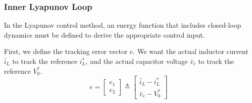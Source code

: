 \documentclass[DIV=calc, paper=a4, fontsize=11pt, twocolumn]{scrartcl}	 %
\begin{document}
\subsubsection{Inner Lyapunov Loop}
In the Lyapunov control method, an energy function that includes closed-loop dynamics must be defined to derive the appropriate control input.

First, we define the tracking error vector $e$. We want the actual inductor current $\bar{i}_L$ to track the reference $i_L^*$, and the actual capacitor voltage $\bar{v}_c$ to track the reference $V_0^*$. 
\begin{equation}\label{eq:error_state}
    e = \begin{bmatrix} e_1 \\ e_2 \end{bmatrix} \triangleq \begin{bmatrix} \bar{i}_L - i_L^* \\ \bar{v}_c - V_0^* \end{bmatrix}
\end{equation}
\end{document}
